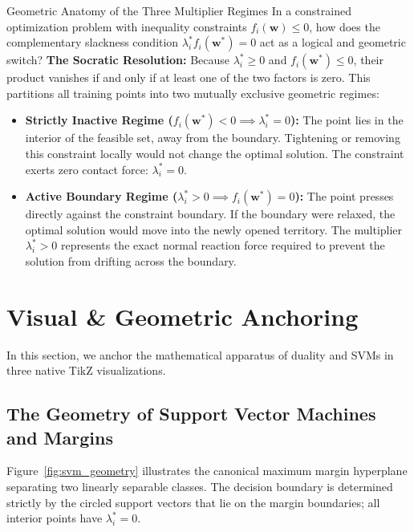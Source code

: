 \begin{ponderbox}{Geometric Anatomy of the Three Multiplier Regimes}
In a constrained optimization problem with inequality constraints $f_i(\mathbf{w}) \le 0$, how does the complementary slackness condition $\lambda_i^* f_i(\mathbf{w}^*) = 0$ act as a logical and geometric switch?
\tcblower
\textbf{The Socratic Resolution:} Because $\lambda_i^* \ge 0$ and $f_i(\mathbf{w}^*) \le 0$, their product vanishes if and only if at least one of the two factors is zero. This partitions all training points into two mutually exclusive geometric regimes:
\begin{itemize}
    \item \textbf{Strictly Inactive Regime ($f_i(\mathbf{w}^*) < 0 \implies \lambda_i^* = 0$):} The point lies in the interior of the feasible set, away from the boundary. Tightening or removing this constraint locally would not change the optimal solution. The constraint exerts zero contact force: $\lambda_i^* = 0$.
    \item \textbf{Active Boundary Regime ($\lambda_i^* > 0 \implies f_i(\mathbf{w}^*) = 0$):} The point presses directly against the constraint boundary. If the boundary were relaxed, the optimal solution would move into the newly opened territory. The multiplier $\lambda_i^* > 0$ represents the exact normal reaction force required to prevent the solution from drifting across the boundary.
\end{itemize}
\end{ponderbox}

\section{Visual \& Geometric Anchoring}

In this section, we anchor the mathematical apparatus of duality and SVMs in three native TikZ visualizations.

\subsection{The Geometry of Support Vector Machines and Margins}
Figure~\ref{fig:svm_geometry} illustrates the canonical maximum margin hyperplane separating two linearly separable classes. The decision boundary is determined strictly by the circled support vectors that lie on the margin boundaries; all interior points have $\lambda_i^* = 0$.

